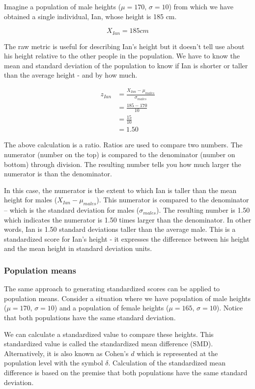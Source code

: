 \documentclass[
]{krantz}
\begin{document}
Imagine a population of male heights (\(\mu = 170\), \(\sigma = 10\)) from which we have obtained a single individual, Ian, whose height is 185 cm.

\[
X_{Ian} = 185cm
\]

The raw metric is useful for describing Ian's height but it doesn't tell use about his height relative to the other people in the population. We have to know the mean and standard deviation of the population to know if Ian is shorter or taller than the average height - and by how much.

\[
\begin{aligned} 
z_{Ian} &=  \frac{X_{Ian} - \mu_{males}}{\sigma_{males}}\\ 
&=  \frac{185 - 170}{10}\\
&=  \frac{15}{10}\\
&= 1.50
\end{aligned} 
\]

The above calculation is a ratio. Ratios are used to compare two numbers. The numerator (number on the top) is compared to the denominator (number on bottom) through division. The resulting number tells you how much larger the numerator is than the denominator.

In this case, the numerator is the extent to which Ian is taller than the mean height for males (\(X_{Ian} - \mu_{males}\)). This numerator is compared to the denominator -- which is the standard deviation for males (\(\sigma_{males}\)). The resulting number is 1.50 which indicates the numerator is 1.50 times larger than the denominator. In other words, Ian is 1.50 standard deviations taller than the average male. This is a standardized score for Ian's height - it expresses the difference between his height and the mean height in standard deviation units.

\hypertarget{population-means}{%
\subsubsection{Population means}\label{population-means}}

The same approach to generating standardized scores can be applied to population means. Consider a situation where we have population of male heights (\(\mu = 170\), \(\sigma = 10\)) and a population of female heights (\(\mu = 165\), \(\sigma = 10\)). Notice that both populations have the same standard deviation.

We can calculate a standardized value to compare these heights. This standardized value is called the standardized mean difference (SMD). Alternatively, it is also known as Cohen's \(d\) which is represented at the population level with the symbol \(\delta\). Calculation of the standardized mean difference is based on the premise that both populations have the same standard deviation.
\end{document}
